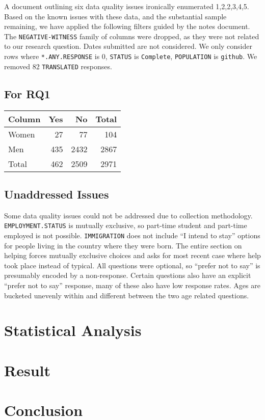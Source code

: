 \documentclass[journal,12pt,onecolumn,]{IEEEtran}
\begin{document}
A document outlining six data quality issues ironically enumerated 1,2,2,3,4,5.
Based on the known issues with these data, and the substantial sample remaining, we have applied the following filters guided by the notes document.
The \texttt{NEGATIVE-WITNESS} family of columns were dropped, as they were not related to our research question.
Dates submitted are not considered.
We only consider rows where \texttt{*.ANY.RESPONSE} is 0, \texttt{STATUS} is \texttt{Complete}, \texttt{POPULATION} is \texttt{github}.
We removed 82 \texttt{TRANSLATED} responses.

\subsection{For RQ1}

\begin{tabular}{lrrr}
    \toprule
    Column & Yes & No   & Total \\
    \midrule
    Women  & 27  & 77   & 104   \\
    Men    & 435 & 2432 & 2867  \\
    Total  & 462 & 2509 & 2971  \\
    \bottomrule
\end{tabular}

\subsection{Unaddressed Issues}

Some data quality issues could not be addressed due to collection methodology.
\texttt{EMPLOYMENT.STATUS} is mutually exclusive, so part-time student and part-time employed is not possible.
\texttt{IMMIGRATION} does not include ``I intend to stay'' options for people living in the country where they were born.
The entire section on helping forces mutually exclusive choices and asks for most recent case where help took place instead of typical.
All questions were optional, so ``prefer not to say'' is presumably encoded by a non-response. Certain questions also have an explicit ``prefer not to say'' response, many of these also have low response rates.
Ages are bucketed unevenly within and different between the two age related questions.

\section{Statistical Analysis}

\section{Result}


\section{Conclusion}



\end{document}

